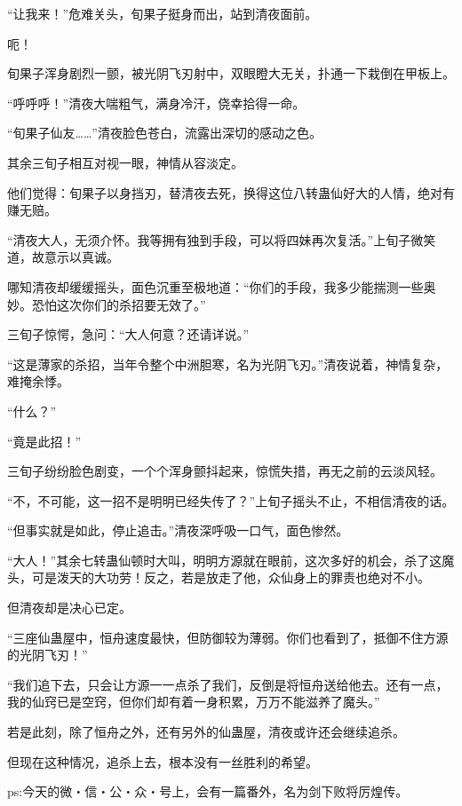 \begin{this_body}
“让我来！”危难关头，旬果子挺身而出，站到清夜面前。

呃！

旬果子浑身剧烈一颤，被光阴飞刃射中，双眼瞪大无关，扑通一下栽倒在甲板上。

“呼呼呼！”清夜大喘粗气，满身冷汗，侥幸拾得一命。

“旬果子仙友……”清夜脸色苍白，流露出深切的感动之色。

其余三旬子相互对视一眼，神情从容淡定。

他们觉得：旬果子以身挡刃，替清夜去死，换得这位八转蛊仙好大的人情，绝对有赚无赔。

“清夜大人，无须介怀。我等拥有独到手段，可以将四妹再次复活。”上旬子微笑道，故意示以真诚。

哪知清夜却缓缓摇头，面色沉重至极地道：“你们的手段，我多少能揣测一些奥妙。恐怕这次你们的杀招要无效了。”

三旬子惊愕，急问：“大人何意？还请详说。”

“这是薄家的杀招，当年令整个中洲胆寒，名为光阴飞刃。”清夜说着，神情复杂，难掩余悸。

“什么？”

“竟是此招！”

三旬子纷纷脸色剧变，一个个浑身颤抖起来，惊慌失措，再无之前的云淡风轻。

“不，不可能，这一招不是明明已经失传了？”上旬子摇头不止，不相信清夜的话。

“但事实就是如此，停止追击。”清夜深呼吸一口气，面色惨然。

“大人！”其余七转蛊仙顿时大叫，明明方源就在眼前，这次多好的机会，杀了这魔头，可是泼天的大功劳！反之，若是放走了他，众仙身上的罪责也绝对不小。

但清夜却是决心已定。

“三座仙蛊屋中，恒舟速度最快，但防御较为薄弱。你们也看到了，抵御不住方源的光阴飞刃！”

“我们追下去，只会让方源一一点杀了我们，反倒是将恒舟送给他去。还有一点，我的仙窍已是空窍，但你们却有着一身积累，万万不能滋养了魔头。”

若是此刻，除了恒舟之外，还有另外的仙蛊屋，清夜或许还会继续追杀。

但现在这种情况，追杀上去，根本没有一丝胜利的希望。

ps:今天的微・信・公・众・号上，会有一篇番外，名为剑下败将厉煌传。

\end{this_body}

